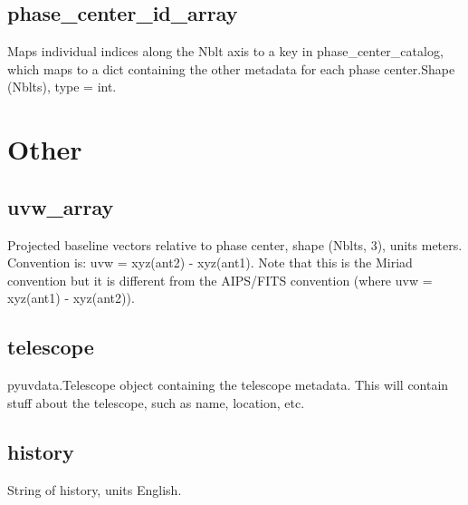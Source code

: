 \documentclass[12pt]{article}
\begin{document}
\subsection{phase\_center\_id\_array}
Maps individual indices along the Nblt axis to a key in phase\_center\_catalog, which maps to a dict containing the other metadata for each phase center.Shape (Nblts), type = int.


\section{Other}


\subsection{uvw\_array}
Projected baseline vectors relative to phase center, shape (Nblts, 3), units meters. 
Convention is: uvw = xyz(ant2) - xyz(ant1).
Note that this is the Miriad convention but it is different from the AIPS/FITS convention (where uvw = xyz(ant1) - xyz(ant2)).


\subsection{telescope}
pyuvdata.Telescope object containing the telescope metadata.
This will contain stuff about the telescope, such as name, location, etc. 


\subsection{history}
String of history, units English.
\end{document}
